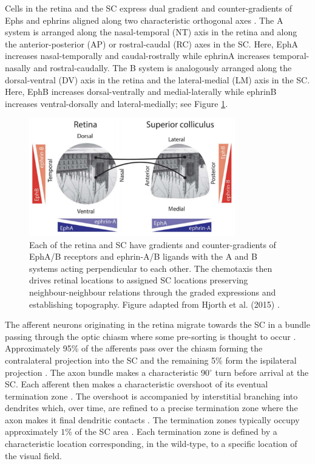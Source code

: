 Cells in the retina and the SC express dual gradient and counter-gradients of Ephs and ephrins aligned along two characteristic orthogonal axes \cite{Marcus1996-kh, McLaughlin2005-jd, Lemke2005-iz}. The A system is arranged along the nasal-temporal (NT) axis in the retina and along the anterior-posterior (AP) or rostral-caudal (RC) axes in the SC. Here, EphA increases nasal-temporally and caudal-rostrally while ephrinA increases temporal-nasally and rostral-caudally. The B system is analogously arranged along the dorsal-ventral (DV) axis in the retina and the lateral-medial (LM) axis in the SC. Here, EphB increases dorsal-ventrally and medial-laterally while ephrinB increases ventral-dorsally and lateral-medially; see Figure \ref{fig:gradients}.

\begin{figure}[h!]
	\centering
	\includegraphics[width = 0.8\textwidth]{images/introduction/hjorth_gradients}
	\def\c{Each of the retina and SC have gradients and counter-gradients of EphA/B receptors and ephrin-A/B ligands with the A and B systems acting perpendicular to each other. }
	\caption[\c]{\c The chemotaxis then drives retinal locations to assigned SC locations preserving neighbour-neighbour relations through the graded expressions and establishing topography. Figure adapted from Hjorth et al. (2015) \cite{Hjorth2015-le}. \label{fig:gradients}} 
\end{figure}


The afferent neurons originating in the retina migrate towards the SC in a bundle passing through the optic chiasm where some pre-sorting is thought to occur \cite{Plas2005-yb}. Approximately 95\% of the afferents pass over the chiasm forming the contralateral projection into the SC and the remaining 5\% form the ispilateral projection \cite{Drager1980-px, Herrera2003-td, Koch2011-qz, Petros2008-rd}. The axon bundle makes a characteristic 90$^\circ$ turn before arrival at the SC. Each afferent then makes a characteristic overshoot of its eventual termination zone \cite{Yates2001-ug}. The overshoot is accompanied by interstitial branching into dendrites which, over time, are refined to a precise termination zone where the axon makes it final dendritic contacts \cite{McLaughlin2005-jd}. The termination zones typically occupy approximately $1$\% of the SC area \cite{McLaughlin2003-yy}. Each termination zone is defined by a characteristic location corresponding, in the wild-type, to a specific location of the visual field.

